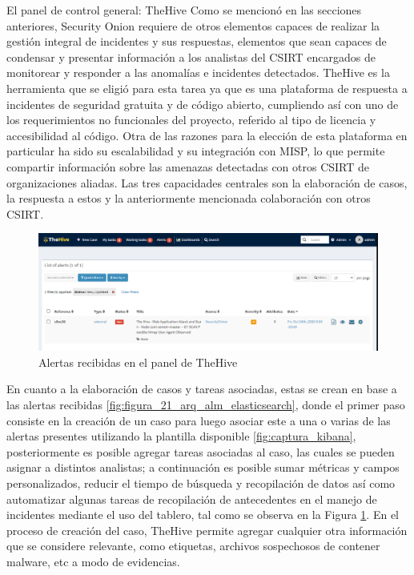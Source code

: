    \begin{section}{El panel de control general: TheHive }
     Como se mencionó en las secciones anteriores, Security Onion requiere de otros elementos capaces de realizar la gestión integral de incidentes y sus respuestas, elementos que sean capaces de condensar y presentar información a los analistas del CSIRT encargados de monitorear y responder a las anomalías e incidentes detectados.  TheHive es la herramienta que se eligió para esta tarea ya que es una plataforma de respuesta a incidentes de seguridad gratuita y de código abierto, cumpliendo así con uno de los requerimientos no funcionales del proyecto, referido al tipo de licencia y accesibilidad al código. Otra de las razones para la elección de esta plataforma en particular ha sido su escalabilidad y su integración con MISP, lo que permite compartir información sobre las amenazas detectadas con otros CSIRT de organizaciones aliadas. Las tres capacidades centrales son la elaboración de casos, la respuesta a estos y la anteriormente mencionada colaboración con otros CSIRT.\par
     \begin{figure}[H]
        \centering
        \includegraphics[width=1\textwidth]{./descripcion_sonion_imagenes/figura_23_alerta_panel_thehive.png}
        \caption{ Alertas recibidas en el panel de TheHive\cite{thehive}}
        \label{fig:alerta_panel_thehive}
     \end{figure}
        \FloatBarrier
        En cuanto a la elaboración de casos y tareas asociadas, estas se crean en base a las alertas recibidas \ref{fig:figura_21_arq_alm_elasticsearch}, donde el primer paso consiste en la creación de un caso para luego asociar este a una o varias de las alertas presentes utilizando la plantilla disponible \ref{fig:captura_kibana}, posteriormente es posible agregar tareas asociadas al caso, las cuales se pueden asignar a distintos analistas; a continuación es posible sumar métricas y campos personalizados, reducir el tiempo de búsqueda y recopilación de datos así como automatizar algunas tareas de recopilación de antecedentes en el manejo de incidentes mediante el uso del tablero, tal como se observa en la Figura \ref{fig:alerta_panel_thehive}. En el proceso de creación del caso, TheHive permite agregar cualquier otra información que se considere relevante, como etiquetas, archivos sospechosos de contener malware, etc a modo de evidencias.

\end{section}
